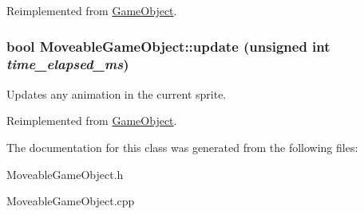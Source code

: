 Reimplemented from \hyperlink{classGameObject_abb64143e72358beb808db22182517802}{GameObject}.\hypertarget{classMoveableGameObject_af2a5d981743e85b4bd35a90f874b361b}{
\subsubsection[{update}]{\setlength{\rightskip}{0pt plus 5cm}bool MoveableGameObject::update (unsigned int {\em time\_\-elapsed\_\-ms})}}
\label{classMoveableGameObject_af2a5d981743e85b4bd35a90f874b361b}
Updates any animation in the current sprite. 

Reimplemented from \hyperlink{classGameObject_ad2f3cd5d1f5a11b237507cd3ee98b95d}{GameObject}.

The documentation for this class was generated from the following files:\begin{DoxyCompactItemize}
\item 
MoveableGameObject.h\item 
MoveableGameObject.cpp\end{DoxyCompactItemize}

